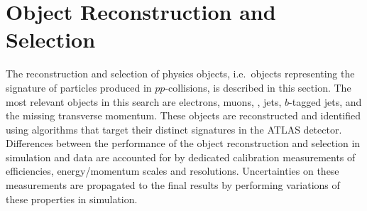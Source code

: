 \section{Object Reconstruction and Selection}
\label{sec:object_reconstruction}

The reconstruction and selection of physics objects, i.e.\ objects representing
the signature of particles produced in $pp$-collisions, is described in this
section. The most relevant objects in this search are electrons, muons,
\tauhadvis, jets, $b$-tagged jets, and the missing transverse momentum. These
objects are reconstructed and identified using algorithms that target their
distinct signatures in the ATLAS detector.
Differences between the performance of the object reconstruction and selection
in simulation and data are accounted for by dedicated calibration measurements
of efficiencies, energy/momentum scales and resolutions. Uncertainties on these
measurements are propagated to the final results by performing variations of
these properties in simulation.

